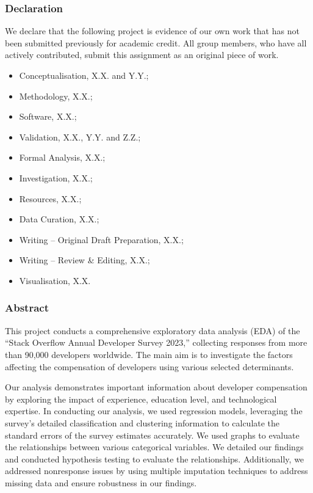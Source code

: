 \documentclass[
  12pt,
]{article}
\author{}
\date{\vspace{-2.5em}}
\providecommand{\tightlist}{%
  \setlength{\itemsep}{0pt}\setlength{\parskip}{0pt}}
\begin{document}
\hypertarget{declaration}{%
\subsubsection{Declaration}\label{declaration}}

We declare that the following project is evidence of our own work that
has not been submitted previously for academic credit. All group
members, who have all actively contributed, submit this assignment as an
original piece of work.

\begin{itemize}
\tightlist
\item
  Conceptualisation, X.X. and Y.Y.;
\item
  Methodology, X.X.;
\item
  Software, X.X.;
\item
  Validation, X.X., Y.Y. and Z.Z.;
\item
  Formal Analysis, X.X.;
\item
  Investigation, X.X.;
\item
  Resources, X.X.;
\item
  Data Curation, X.X.;
\item
  Writing -- Original Draft Preparation, X.X.;
\item
  Writing -- Review \& Editing, X.X.;
\item
  Visualisation, X.X.
\end{itemize}

\hypertarget{abstract}{%
\subsubsection{Abstract}\label{abstract}}

This project conducts a comprehensive exploratory data analysis (EDA) of
the ``Stack Overflow Annual Developer Survey 2023,'' collecting
responses from more than 90,000 developers worldwide. The main aim is to
investigate the factors affecting the compensation of developers using
various selected determinants.

Our analysis demonstrates important information about developer
compensation by exploring the impact of experience, education level, and
technological expertise. In conducting our analysis, we used regression
models, leveraging the survey's detailed classification and clustering
information to calculate the standard errors of the survey estimates
accurately. We used graphs to evaluate the relationships between various
categorical variables. We detailed our findings and conducted hypothesis
testing to evaluate the relationships. Additionally, we addressed
nonresponse issues by using multiple imputation techniques to address
missing data and ensure robustness in our findings.
\end{document}
